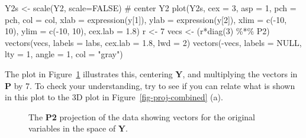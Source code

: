 \documentclass[
  letterpaper,
  10pt,
  krantz2]{krantz}
\makeatletter
\newenvironment{Shaded}{\begin{snugshade}}{\end{snugshade}}
\newcommand{\AttributeTok}[1]{\textcolor[rgb]{0.40,0.45,0.13}{#1}}
\newcommand{\CommentTok}[1]{\textcolor[rgb]{0.37,0.37,0.37}{#1}}
\newcommand{\ConstantTok}[1]{\textcolor[rgb]{0.56,0.35,0.01}{#1}}
\newcommand{\DecValTok}[1]{\textcolor[rgb]{0.68,0.00,0.00}{#1}}
\newcommand{\FloatTok}[1]{\textcolor[rgb]{0.68,0.00,0.00}{#1}}
\newcommand{\FunctionTok}[1]{\textcolor[rgb]{0.28,0.35,0.67}{#1}}
\newcommand{\NormalTok}[1]{\textcolor[rgb]{0.00,0.23,0.31}{#1}}
\newcommand{\OtherTok}[1]{\textcolor[rgb]{0.00,0.23,0.31}{#1}}
\newcommand{\SpecialCharTok}[1]{\textcolor[rgb]{0.37,0.37,0.37}{#1}}
\newcommand{\StringTok}[1]{\textcolor[rgb]{0.13,0.47,0.30}{#1}}
\newenvironment{kframe}{%
  \medskip{}
  \setlength{\fboxsep}{.8em}
  \def\at@end@of@kframe{}%
  \ifinner\ifhmode%
  \def\at@end@of@kframe{\end{minipage}}%
  \begin{minipage}{\columnwidth}%
  \fi\fi%
  \def\FrameCommand##1{\hskip\@totalleftmargin \hskip-\fboxsep
  \colorbox{shadecolor}{##1}\hskip-\fboxsep
      \hskip-\linewidth \hskip-\@totalleftmargin \hskip\columnwidth}%
  \MakeFramed {\advance\hsize-\width
    \@totalleftmargin\z@ \linewidth\hsize
    \@setminipage}}%
{\par\unskip\endMakeFramed%
  \at@end@of@kframe}
\renewenvironment{Shaded}{\begin{kframe}}{\end{kframe}}
\makeatother
\begin{document}
\begin{Shaded}
\begin{Highlighting}[]
\NormalTok{Y2s }\OtherTok{\textless{}{-}} \FunctionTok{scale}\NormalTok{(Y2, }\AttributeTok{scale=}\ConstantTok{FALSE}\NormalTok{)       }\CommentTok{\# center Y2}
\FunctionTok{plot}\NormalTok{(Y2s, }\AttributeTok{cex =} \DecValTok{3}\NormalTok{, }
     \AttributeTok{asp =} \DecValTok{1}\NormalTok{,}
     \AttributeTok{pch =}\NormalTok{ pch, }\AttributeTok{col =}\NormalTok{ col,}
     \AttributeTok{xlab =} \FunctionTok{expression}\NormalTok{(y[}\DecValTok{1}\NormalTok{]), }\AttributeTok{ylab =} \FunctionTok{expression}\NormalTok{(y[}\DecValTok{2}\NormalTok{]),}
     \AttributeTok{xlim =} \FunctionTok{c}\NormalTok{(}\SpecialCharTok{{-}}\DecValTok{10}\NormalTok{, }\DecValTok{10}\NormalTok{), }\AttributeTok{ylim =} \FunctionTok{c}\NormalTok{(}\SpecialCharTok{{-}}\DecValTok{10}\NormalTok{, }\DecValTok{10}\NormalTok{), }\AttributeTok{cex.lab =} \FloatTok{1.8}\NormalTok{)}
\NormalTok{r }\OtherTok{\textless{}{-}} \DecValTok{7}
\NormalTok{vecs }\OtherTok{\textless{}{-}}\NormalTok{ (r}\SpecialCharTok{*}\FunctionTok{diag}\NormalTok{(}\DecValTok{3}\NormalTok{) }\SpecialCharTok{\%*\%}\NormalTok{ P2)}
\FunctionTok{vectors}\NormalTok{(vecs, }\AttributeTok{labels =}\NormalTok{ labs, }\AttributeTok{cex.lab =} \FloatTok{1.8}\NormalTok{, }\AttributeTok{lwd =} \DecValTok{2}\NormalTok{)}
\FunctionTok{vectors}\NormalTok{(}\SpecialCharTok{{-}}\NormalTok{vecs, }\AttributeTok{labels =} \ConstantTok{NULL}\NormalTok{, }\AttributeTok{lty =} \DecValTok{1}\NormalTok{, }\AttributeTok{angle =} \DecValTok{1}\NormalTok{, }\AttributeTok{col =} \StringTok{"gray"}\NormalTok{)}
\end{Highlighting}
\end{Shaded}

The plot in Figure~\ref{fig-proj-P2-vec} illustrates this, centering
\(\mathbf{Y}\), and multiplying the vectors in \(\mathbf{P}\) by 7. To
check your understanding, try to see if you can relate what is shown in
this plot to the 3D plot in Figure~\ref{fig-proj-combined} (a).

\begin{figure}


\caption{\label{fig-proj-P2-vec}The \textbf{P2} projection of the data
showing vectors for the original variables in the space of \textbf{Y}.}

\end{figure}%
\end{document}
